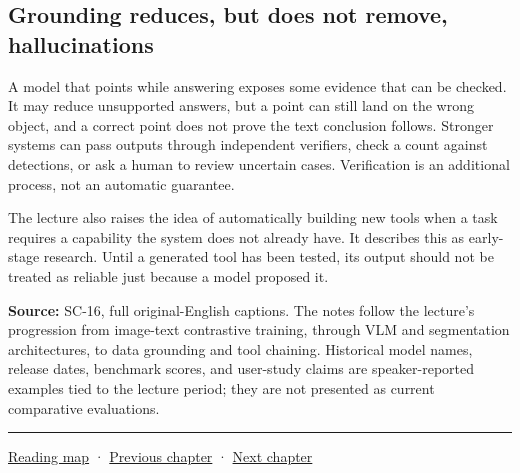 \subsection{Grounding reduces, but does not remove, hallucinations}\label{04-visual-computing-ii-ch031-grounding-reduces-but-does-not-remove-hallucinations}

A model that points while answering exposes some evidence that can be checked. It may reduce unsupported answers, but a point can still land on the wrong object, and a correct point does not prove the text conclusion follows. Stronger systems can pass outputs through independent verifiers, check a count against detections, or ask a human to review uncertain cases. Verification is an additional process, not an automatic guarantee.

The lecture also raises the idea of automatically building new tools when a task requires a capability the system does not already have. It describes this as early-stage research. Until a generated tool has been tested, its output should not be treated as reliable just because a model proposed it.

\textbf{Source:} SC-16, full original-English captions. The notes follow the lecture's progression from image-text contrastive training, through VLM and segmentation architectures, to data grounding and tool chaining. Historical model names, release dates, benchmark scores, and user-study claims are speaker-reported examples tied to the lecture period; they are not presented as current comparative evaluations.

\begin{center}\rule{0.5\linewidth}{0.5pt}\end{center}

\hyperref[volume-reading-map]{Reading map} · \hyperref[04-visual-computing-ii-ch030]{Previous chapter} · \hyperref[04-visual-computing-ii-ch032]{Next chapter}
